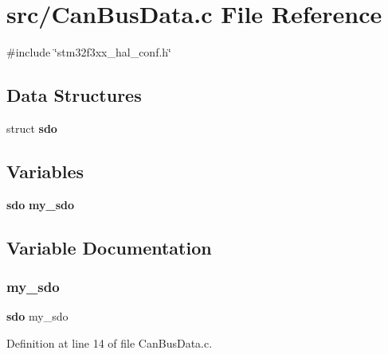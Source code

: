 \section{src/\+Can\+Bus\+Data.c File Reference}
\label{_can_bus_data_8c}
{\ttfamily \#include \char`\"{}stm32f3xx\+\_\+hal\+\_\+conf.\+h\char`\"{}}\newline
\subsection*{Data Structures}
\begin{DoxyCompactItemize}
\item 
struct \textbf{ sdo}
\end{DoxyCompactItemize}
\subsection*{Variables}
\begin{DoxyCompactItemize}
\item 
\textbf{ sdo} \textbf{ my\+\_\+sdo}
\end{DoxyCompactItemize}


\subsection{Variable Documentation}
\mbox{\label{_can_bus_data_8c_abfd0b99158871d264bb097f93a01bc85}} 
\subsubsection{my\+\_\+sdo}
{\footnotesize\ttfamily \textbf{ sdo} my\+\_\+sdo}



Definition at line 14 of file Can\+Bus\+Data.\+c.

